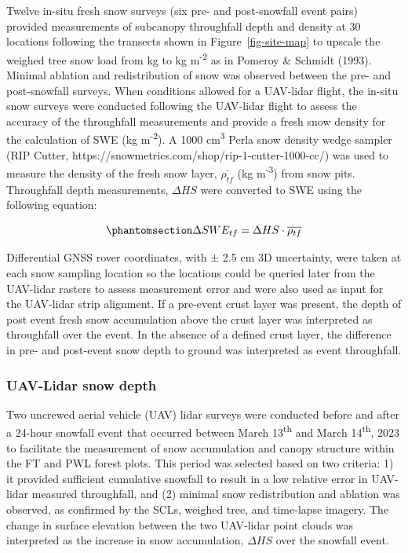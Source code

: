 \documentclass[
  letterpaper,
  DIV=11,
  numbers=noendperiod]{scrartcl}
\begin{document}
Twelve in-situ fresh snow surveys (six pre- and post-snowfall event
pairs) provided measurements of subcanopy throughfall depth and density
at 30 locations following the transects shown in
Figure~\ref{fig-site-map} to upscale the weighed tree snow load from kg
to kg m\textsuperscript{-2} as in Pomeroy \& Schmidt (1993). Minimal
ablation and redistribution of snow was observed between the pre- and
post-snowfall surveys. When conditions allowed for a UAV-lidar flight,
the in-situ snow surveys were conducted following the UAV-lidar flight
to assess the accuracy of the throughfall measurements and provide a
fresh snow density for the calculation of SWE (kg
m\textsuperscript{-2}). A 1000 cm\textsuperscript{3} Perla snow density
wedge sampler (RIP Cutter,
https://snowmetrics.com/shop/rip-1-cutter-1000-cc/) was used to measure
the density of the fresh snow layer, \(\overline{\rho_{tf}}\) (kg
m\textsuperscript{-3}) from snow pits. Throughfall depth measurements,
\(\Delta HS\) were converted to SWE using the following equation:

\begin{equation}\phantomsection\label{eq-swe-tf}{
\Delta SWE_{tf} = \Delta HS \cdot \overline{\rho_{tf}}
}\end{equation}

Differential GNSS rover coordinates, with ± 2.5 cm 3D uncertainty, were
taken at each snow sampling location so the locations could be queried
later from the UAV-lidar rasters to assess measurement error and were
also used as input for the UAV-lidar strip alignment. If a pre-event
crust layer was present, the depth of post event fresh snow accumulation
above the crust layer was interpreted as throughfall over the event. In
the absence of a defined crust layer, the difference in pre- and
post-event snow depth to ground was interpreted as event throughfall.

\subsubsection{UAV-Lidar snow depth}\label{uav-lidar-snow-depth}

Two uncrewed aerial vehicle (UAV) lidar surveys were conducted before
and after a 24-hour snowfall event that occurred between March
13\textsuperscript{th} and March 14\textsuperscript{th}, 2023 to
facilitate the measurement of snow accumulation and canopy structure
within the FT and PWL forest plots. This period was selected based on
two criteria: 1) it provided sufficient cumulative snowfall to result in
a low relative error in UAV-lidar measured throughfall, and (2) minimal
snow redistribution and ablation was observed, as confirmed by the SCLs,
weighed tree, and time-lapse imagery. The change in surface elevation
between the two UAV-lidar point clouds was interpreted as the increase
in snow accumulation, \(\Delta HS\) over the snowfall event.
\end{document}
